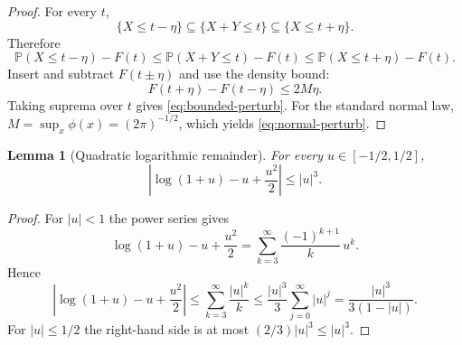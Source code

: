 \documentclass[11pt]{amsart}
\numberwithin{equation}{section}
\newtheorem{lemma}[theorem]{Lemma}
\theoremstyle{definition}
\newcommand{\PP}{\mathbb P}
\begin{document}
\begin{proof}
For every $t$,
\[
\{X\le t-\eta\}\subseteq \{X+Y\le t\}\subseteq \{X\le t+\eta\}.
\]
Therefore
\[
\PP(X\le t-\eta)-F(t)\le \PP(X+Y\le t)-F(t)
\le \PP(X\le t+\eta)-F(t).
\]
Insert and subtract $F(t\pm \eta)$ and use the density bound:
\[
F(t+\eta)-F(t-\eta)\le 2M\eta.
\]
Taking suprema over $t$ gives \eqref{eq:bounded-perturb}.  For the standard normal law,
\(
M=\sup_x \phi(x)=(2\pi)^{-1/2}
\),
which yields \eqref{eq:normal-perturb}.
\end{proof}

\begin{lemma}[Quadratic logarithmic remainder]\label{lem:log-remainder}
For every $u\in[-1/2,1/2]$,
\[
\left|\log(1+u)-u+\frac{u^2}{2}\right|
\le |u|^3. \tag{6.11}\label{eq:log-rem}
\]
\end{lemma}

\begin{proof}
For $|u|<1$ the power series gives
\[
\log(1+u)-u+\frac{u^2}{2}
=
\sum_{k=3}^{\infty}\frac{(-1)^{k+1}}{k}\,u^k.
\]
Hence
\[
\left|\log(1+u)-u+\frac{u^2}{2}\right|
\le
\sum_{k=3}^{\infty}\frac{|u|^k}{k}
\le
\frac{|u|^3}{3}\sum_{j=0}^{\infty}|u|^j
=
\frac{|u|^3}{3(1-|u|)}.
\]
For $|u|\le 1/2$ the right-hand side is at most $(2/3)|u|^3\le |u|^3$.
\end{proof}
\end{document}

